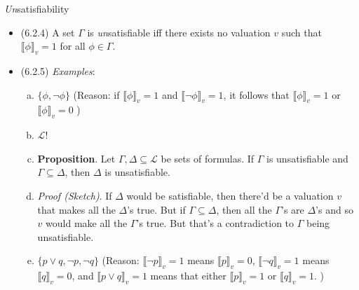 \begin{frame}{\emph{Un}satisfiability}
	
	\begin{itemize}

		\item (6.2.4) A set $\Gamma$ is \emph{un}satisfiable iff there exists no valuation $v$ such that $\llbracket\phi\rrbracket_v=1$ for all $\phi\in\Gamma$.
		
		\item (6.2.5) \emph{Examples}:
		
			\begin{enumerate}[(a)]
			
				\item $\{\phi,\neg\phi\}$ (Reason: if $\llbracket\phi\rrbracket_v=1$ and $\llbracket\neg \phi\rrbracket_v=1$, it follows that $\llbracket\phi\rrbracket_v=1$ or $\llbracket\phi\rrbracket_v=0$ \lightning)
				
				\item $\mathcal{L}$!
				
				\item \textbf{Proposition}. Let $\Gamma,\Delta\subseteq\mathcal{L}$ be sets of formulas. If $\Gamma$ is unsatisfiable and $\Gamma\subseteq \Delta$, then $\Delta$ is unsatisfiable.
				
				\item[] \emph{Proof (Sketch)}. If $\Delta$ would be satisfiable, then there'd be a valuation $v$ that makes all the $\Delta$'s true. But if $\Gamma\subseteq\Delta$, then all the $\Gamma$'s are $\Delta$'s and so $v$ would make all the $\Gamma$'s true. But that's a contradiction to $\Gamma$ being unsatisfiable.
				
				\item $\{p\lor q, \neg p, \neg q\}$ (Reason: $\llbracket\neg p\rrbracket_v=1$ means $\llbracket p\rrbracket_v=0$, $\llbracket\neg q\rrbracket_v=1$ means $\llbracket q\rrbracket_v=0$, and $\llbracket p\lor q\rrbracket_v=1$ means that either $\llbracket p\rrbracket_v=1$ or $\llbracket q\rrbracket_v=1$. \lightning)
			
			\end{enumerate}
	
	\end{itemize}

\end{frame}


